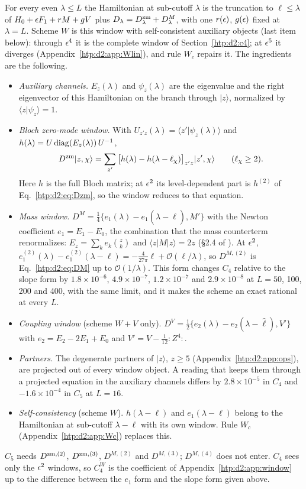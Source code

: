 For every even $\lambda\le L$ the Hamiltonian at sub-cutoff $\lambda$ is the truncation to $\ell\le\lambda$ of
$H_0+\epsilon F_1+rM+gV$ plus $D_\lambda=D^{\rm zm}_\lambda+D^M_\lambda$, with one $r(\epsilon)$, $g(\epsilon)$ fixed at $\lambda=L$. Scheme $W$ is
this window with self-consistent auxiliary objects (last item below): through $\epsilon^4$ it is the complete window of
Section~\ref{htp:d2:c4}; at $\epsilon^5$ it diverges (Appendix~\ref{htp:d2:app:Wlin}), and rule $W_c$ repairs it. The ingredients are the
following.
\begin{itemize}
\item \emph{Auxiliary channels.} $E_z(\lambda)$ and $\psi_z(\lambda)$ are the eigenvalue and the right eigenvector of this
 Hamiltonian on the branch through $|z\rangle$, normalized by $\langle z|\psi_z\rangle=1$.
\item \emph{Bloch zero-mode window.} With $U_{z'z}(\lambda)=\langle z'|\psi_z(\lambda)\rangle$ and
 $h(\lambda)=U\,{\rm diag}(E_z(\lambda))\,U^{-1}$,
 \[
  D^{\rm zm}|z,\chi\rangle=\sum_{z'}\big[h(\lambda)-h(\lambda-\ell_\chi)\big]_{z'z}|z',\chi\rangle\qquad(\ell_\chi\ge2).
 \]
 Here $h$ is the full Bloch matrix; at $\epsilon^2$ its level-dependent part is $h^{(2)}$ of Eq.~\eqref{htp:d2:eq:Dzm}, so the
 window reduces to that equation.
\item \emph{Mass window.} $D^M=\frac14\{e_1(\lambda)-e_1(\lambda-\hat\ell),M'\}$ with the Newton coefficient
 $e_1=E_1-E_0$, the combination that the mass counterterm renormalizes: $E_z=\sum_ke_k\binom zk$ and
 $\langle z|M|z\rangle=2z$ (\S2.4 of ). At $\epsilon^2$, $e_1^{(2)}(\lambda)-e_1^{(2)}(\lambda-\ell)=-\frac4{27\pi}\ell+\mathcal O(\ell/\lambda)$, so
 $D^{M,(2)}$ is Eq.~\eqref{htp:d2:eq:DM} up to $\mathcal O(1/\lambda)$. This form changes $C_4$ relative to the slope form by
 $1.8\times10^{-6}$, $4.9\times10^{-7}$, $1.2\times10^{-7}$ and $2.9\times10^{-8}$ at $L=50$, 100, 200 and 400, with the same
 limit, and it makes the scheme an exact rational at every $L$.
\item \emph{Coupling window} (scheme $W{+}V$ only). $D^V=\frac12\{e_2(\lambda)-e_2(\lambda-\hat\ell),V'\}$ with
 $e_2=E_2-2E_1+E_0$ and $V'=V-\frac1{12}{:}Z^4{:}$.
\item \emph{Partners.} The degenerate partners of $|z\rangle$, $z\ge5$ (Appendix~\ref{htp:d2:app:ops}), are projected out of every
 window object. A reading that keeps them through a projected equation in the auxiliary channels differs by
 $2.8\times10^{-5}$ in $C_4$ and $-1.6\times10^{-4}$ in $C_5$ at $L=16$.
\item \emph{Self-consistency} (scheme $W$). $h(\lambda-\ell)$ and $e_1(\lambda-\ell)$ belong to the Hamiltonian at
 sub-cutoff $\lambda-\ell$ with its own window. Rule $W_c$ (Appendix~\ref{htp:d2:app:Wc}) replaces this.
\end{itemize}
$C_5$ needs $D^{{\rm zm},(2)}$, $D^{{\rm zm},(3)}$, $D^{M,(2)}$ and $D^{M,(3)}$; $D^{M,(4)}$ does not enter. $C_4$ sees only the
$\epsilon^2$ windows, so $C_4^W$ is the coefficient of Appendix~\ref{htp:d2:app:window} up to the difference between the $e_1$ form
and the slope form given above.

